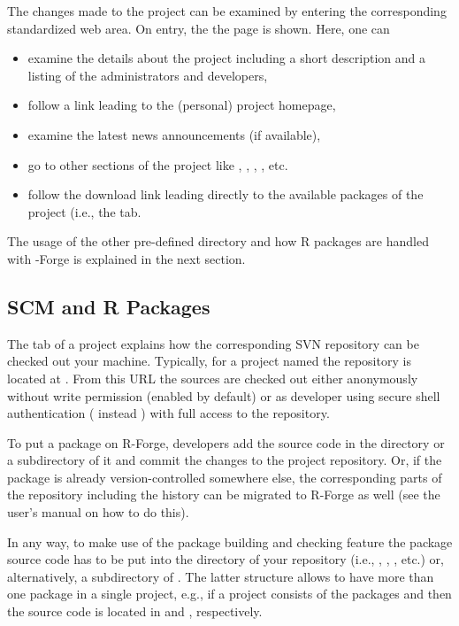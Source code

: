 The changes made to the project can be examined by entering the
corresponding standardized web area. On entry, the the 
page is shown. Here, one can 

\begin{itemize}
\item examine the details about the project including a short
  description and a listing of the administrators and developers,
\item follow a link leading to the (personal) project homepage,
\item examine the latest news announcements (if available),
\item go to other sections of the project like
  , ,
   , , etc.
\item follow the download link leading directly to the available
  packages of the project (i.e., the  tab.
\end{itemize}

The usage of the other pre-defined directory  and how R
packages are handled with \R-Forge is explained in the next
section. 


\subsection{SCM and R Packages}

The  tab of a project explains how the corresponding SVN
repository can be checked out your
machine. Typically, for a project named  the repository is
located at . From
this URL the sources are checked out either 
anonymously without write permission (enabled by default) or as
developer using secure shell 
authentication ( instead ) with full
access to the repository.

To put a package on R-Forge, developers add the source code in the
 directory or a subdirectory of it and commit the changes to
the project repository. Or, if the package is already
version-controlled somewhere else, the corresponding parts of the
repository including the history can be migrated to R-Forge as well
(see the user's manual on how to do this).

In any way, to make use of the package building and checking feature
the package source code has to be put into the  directory
of your repository (i.e., ,
, , etc.) or, alternatively, a 
subdirectory of . The latter structure allows to
have more than one package in a single project, e.g., if
a project consists of the packages  and  then the
source code is located in  and ,
respectively.

